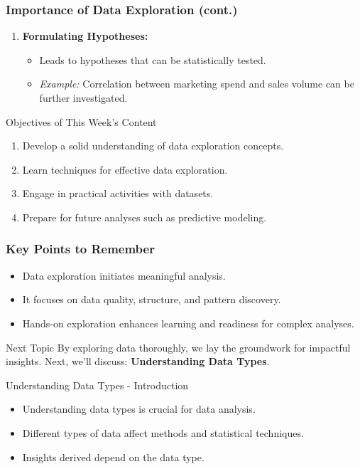 \documentclass[aspectratio=169]{beamer}
\begin{document}
\begin{frame}[fragile]
    \frametitle{Importance of Data Exploration (cont.)}
    \begin{enumerate}[resume]
        \item \textbf{Formulating Hypotheses:}
            \begin{itemize}
                \item Leads to hypotheses that can be statistically tested.
                \item \emph{Example:} Correlation between marketing spend and sales volume can be further investigated.
            \end{itemize}
    \end{enumerate}
    
    \begin{block}{Objectives of This Week's Content}
        \begin{enumerate}
            \item Develop a solid understanding of data exploration concepts.
            \item Learn techniques for effective data exploration.
            \item Engage in practical activities with datasets.
            \item Prepare for future analyses such as predictive modeling.
        \end{enumerate}
    \end{block}
\end{frame}

\begin{frame}[fragile]
    \frametitle{Key Points to Remember}
    \begin{itemize}
        \item Data exploration initiates meaningful analysis.
        \item It focuses on data quality, structure, and pattern discovery.
        \item Hands-on exploration enhances learning and readiness for complex analyses.
    \end{itemize}
    
    \begin{block}{Next Topic}
        By exploring data thoroughly, we lay the groundwork for impactful insights. Next, we'll discuss: \textbf{Understanding Data Types}.
    \end{block}
\end{frame}

\begin{frame}[fragile]{Understanding Data Types - Introduction}
    \begin{itemize}
        \item Understanding data types is crucial for data analysis.
        \item Different types of data affect methods and statistical techniques.
        \item Insights derived depend on the data type.
    \end{itemize}
\end{frame}
\end{document}
